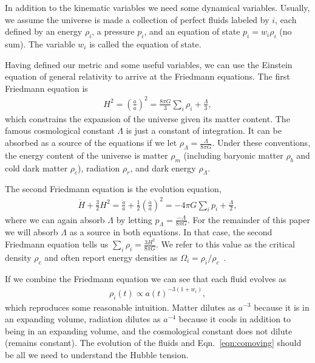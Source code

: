 \documentclass[12pt]{article}
\begin{document}
In addition to the kinematic variables we need some dynamical variables. Usually, we assume the universe is made a collection of perfect fluids labeled by $i$, each defined by an energy $\rho_i$, a pressure $p_i$, and an equation of state $p_i = w_i\rho_i$ (no sum). The variable $w_i$ is called the equation of state. 

Having defined our metric and some useful variables, we can use the Einstein equation of general relativity to arrive at the Friedmann equations. The first Friedmann equation is 
\begin{align}
H^2 = \left(\frac{\dot{a}}{a}\right)^2 = \frac{8\pi G}{3} \sum_i \rho_i  + \frac{\Lambda}{3}, \label{eqn:fri1}
\end{align}
which constrains the expansion of the universe given its matter content. The famous cosmological constant $\Lambda$ is just a constant of integration. It can be absorbed as a source of the equations if we let $\rho_\Lambda=\frac{\Lambda}{8\pi G}$. Under these conventions, the energy content of the universe is matter $\rho_m$ (including baryonic matter $\rho_b$ and cold dark matter $\rho_c$), radiation $\rho_r$, and dark energy $\rho_\Lambda$.

The second Friedmann equation is the evolution equation,
\begin{align}
\dot{H} + \frac{3}{2}H^2 = \frac{\ddot{a}}{a} + \frac{1}{2} \left(\frac{\dot{a}}{a}\right)^2 = -4\pi G\sum_i p_i  + \frac{\Lambda}{2}, \label{eqn:fri2}
\end{align}
where we can again absorb $\Lambda$ by letting $p_\Lambda = \frac{-\Lambda}{8\pi G}$. For the remainder of this paper we will absorb $\Lambda$ as a source in both equations. 
In that case, the second Friedmann equation tells us $\sum_i\rho_i = \frac{3H^2}{8\pi G}$. We refer to this value as the critical density $\rho_c$ and often report energy densities as $\Omega_i = \rho_i/\rho_c$~\cite{Planck2013}.

If we combine the Friedmann equation we can see that each fluid evolves as 
\begin{align}
\rho_i(t) \propto a(t)^{-3(1+w_i)}, \label{eqn:pevolve}
\end{align}
which reproduces some reasonable intuition. Matter dilutes as $a^{-3}$ because it is in an expanding volume, radiation dilutes as $a^{-4}$ because it cools in addition to being in an expanding volume, and the cosmological constant does not dilute (remains constant). The evolution of the fluids and Eqn.~\ref{eqn:comoving} should be all we need to understand the Hubble tension.
\end{document}
